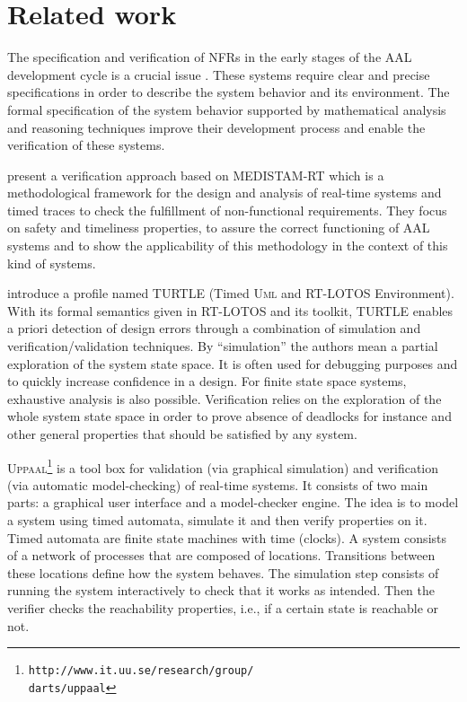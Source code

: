 \documentclass[a4paper,twoside]{article}
\def\UML{\textsc{Uml}}
\def\uppaal{\textsc{Uppaal}}
\begin{document}
\section{Related work}
\label{sec:r_work}

\noindent The specification and verification of NFRs in the early stages of the AAL development cycle is a crucial issue \cite{KBenghazi2009}. These systems require clear and precise specifications in order to describe the system behavior and its environment. The formal specification of the system behavior supported by mathematical analysis and reasoning techniques improve their development process and enable the verification of these systems. 

\cite{JNehmer2006} present a verification approach based on MEDISTAM-RT which is a methodological framework for the design and analysis of real-time systems and timed traces to check the fulfillment of non-functional requirements. They focus on  safety and timeliness properties, to assure the correct functioning of AAL systems and to show the applicability of this methodology in the context of this kind of systems. 

\cite{LApvrille2006} introduce a profile named TURTLE (Timed \UML{} and RT-LOTOS Environment). With its formal semantics given in RT-LOTOS and its toolkit, TURTLE enables a priori detection of design errors through a combination of simulation and verification/validation techniques. By “simulation” the authors mean a partial exploration of the system state space. It is often used for debugging purposes and to quickly increase confidence in a design. For finite state space systems, exhaustive analysis is also possible. Verification relies on the exploration of the whole system state space in order to prove absence of deadlocks for instance and other general properties that should be satisfied by any system.

\uppaal{}\footnote{\texttt{http://www.it.uu.se/research/group/\\darts/uppaal}} is a tool box for validation (via graphical simulation) and verification (via automatic model-checking) of real-time systems. It consists of two main parts: a graphical user interface and a model-checker engine. The idea is to model a system using timed automata, simulate it and then verify properties on it. Timed automata are finite state machines with time (clocks). A system consists of a network of processes that are composed of locations. Transitions between these locations define how the system behaves. The simulation step consists of running the system interactively to check that it works as intended. Then the verifier checks the reachability properties, i.e., if a certain state is reachable or not. 
\end{document}
